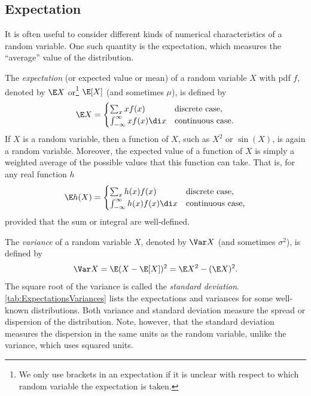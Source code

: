 \subsection{Expectation}
It is often useful to consider different kinds of numerical characteristics of a random variable. One such quantity is the expectation, which measures the ``average'' value of the distribution.

The \textit{expectation} (or expected value or mean) of a random variable $X$ with pdf $f$, denoted by $\E X$ or\footnote{We only use brackets in an expectation if it is unclear with respect to which random variable the expectation is taken.} $\E[X]$ (and sometimes $\mu$), is defined by
\begin{equation*}
	\E X =
	\begin{cases}
		\sum_x x f(x)                      & \text{discrete case,}   \\
		\int_{-\infty}^\infty x f(x) \di x & \text{continuous case.}
	\end{cases}
\end{equation*}
If $X$ is a random variable, then a function of $X$, such as $X^2$ or $\sin(X)$, is again a random variable. Moreover, the expected value of a function of $X$ is simply a weighted average of the possible values that this function can take. That is, for any real function $h$
\begin{equation*}
	\E h(X) =
	\begin{cases}
		\sum_x h(x) f(x)                      & \text{discrete case,}   \\
		\int_{-\infty}^\infty h(x) f(x) \di x & \text{continuous case,}
	\end{cases}
\end{equation*}
provided that the sum or integral are well-defined.

The \textit{variance} of a random variable $X$, denoted by $\Var X$ (and sometimes $\sigma^2$), is defined by
\begin{equation*}
	\Var X = \E(X - \E[X])^2 = \E X^2 - (\E X)^2.
\end{equation*}
The square root of the variance is called the \textit{standard deviation}. \cref{tab:ExpectationsVariances} lists the expectations and variances for some well-known distributions. Both variance and standard deviation measure the spread or dispersion of the distribution. Note, however, that the standard deviation measures the dispersion in the same units as the random variable, unlike the variance, which uses squared units.

